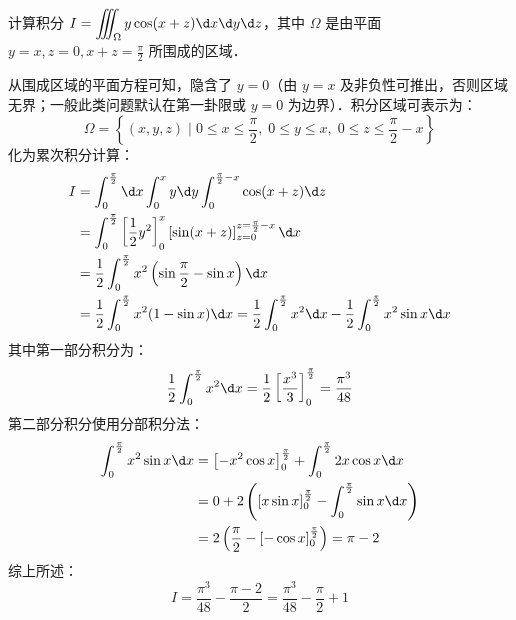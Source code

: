 \documentclass[12pt, a4paper, oneside, UTF8]{ctexbook}
\begin{document}
\begin{exercise}
    计算积分 $\displaystyle I = \iiint_\Omega y\cos(x+z)\d x\d y\d z$，其中 $\Omega$ 是由平面 $y=x,z=0,x+z=\frac{\pi}{2}$ 所围成的区域．
\end{exercise}
\begin{solution}
从围成区域的平面方程可知，隐含了 $y=0$（由 $y=x$ 及非负性可推出，否则区域无界；一般此类问题默认在第一卦限或 $y=0$ 为边界）．积分区域可表示为：
\[ \Omega = \left\{ (x,y,z) \;\bigg|\; 0 \le x \le \frac{\pi}{2}, \; 0 \le y \le x, \; 0 \le z \le \frac{\pi}{2}-x \right\} \]
化为累次积分计算：
\begin{align*}
I &= \int_0^{\frac{\pi}{2}} \d x \int_0^x y \d y \int_0^{\frac{\pi}{2}-x} \cos(x+z) \d z \\
  &= \int_0^{\frac{\pi}{2}} \left[ \frac{1}{2}y^2 \right]_0^x \left[ \sin(x+z) \right]_{z=0}^{z=\frac{\pi}{2}-x} \d x \\
  &= \frac{1}{2} \int_0^{\frac{\pi}{2}} x^2 \left( \sin\frac{\pi}{2} - \sin x \right) \d x \\
  &= \frac{1}{2} \int_0^{\frac{\pi}{2}} x^2 (1 - \sin x) \d x = \frac{1}{2} \int_0^{\frac{\pi}{2}} x^2 \d x - \frac{1}{2} \int_0^{\frac{\pi}{2}} x^2 \sin x \d x
\end{align*}
其中第一部分积分为：
\[ \frac{1}{2} \int_0^{\frac{\pi}{2}} x^2 \d x = \frac{1}{2} \left[ \frac{x^3}{3} \right]_0^{\frac{\pi}{2}} = \frac{\pi^3}{48} \]
第二部分积分使用分部积分法：
\begin{align*}
\int_0^{\frac{\pi}{2}} x^2 \sin x \d x &= \left[ -x^2 \cos x \right]_0^{\frac{\pi}{2}} + \int_0^{\frac{\pi}{2}} 2x \cos x \d x \\
&= 0 + 2 \left( [x \sin x]_0^{\frac{\pi}{2}} - \int_0^{\frac{\pi}{2}} \sin x \d x \right) \\
&= 2 \left( \frac{\pi}{2} - [-\cos x]_0^{\frac{\pi}{2}} \right) = \pi - 2
\end{align*}
综上所述：
\[ I = \frac{\pi^3}{48} - \frac{\pi - 2}{2} = \boxed{\frac{\pi^3}{48} - \frac{\pi}{2} + 1} \]
\end{solution}
\end{document}
